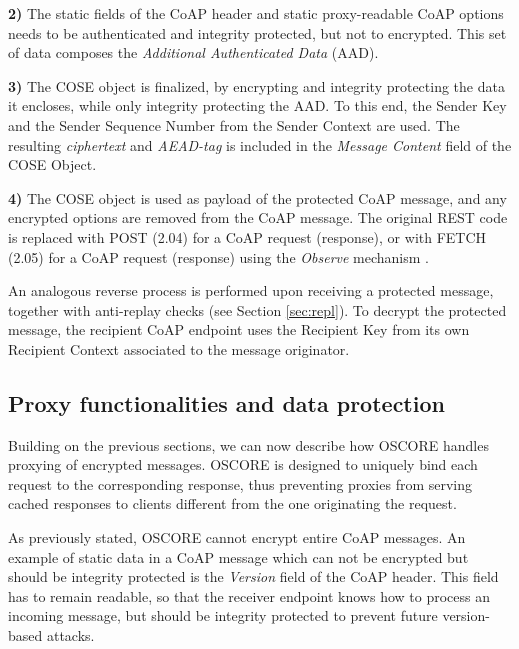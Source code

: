 {\noindent
\textbf{2)} The static fields of the CoAP header and static proxy-readable CoAP options needs to be authenticated and integrity protected, but not to encrypted. This set of data composes the \emph{Additional Authenticated Data} (AAD).

\noindent
\textbf{3)} The COSE object is finalized, by encrypting and integrity protecting the data it encloses, while only integrity protecting the AAD. To this end, the Sender Key and the Sender Sequence Number from the Sender Context are used. The resulting \emph{ciphertext} and \emph{AEAD-tag} is included in the \emph{Message Content} field of the COSE Object.

\noindent
\textbf{4)} The COSE object is used as payload of the protected CoAP message, and any encrypted options are removed from the CoAP message. The original REST code is replaced with POST (2.04) for a CoAP request (response), or with FETCH (2.05) for a CoAP request (response) using the \emph{Observe} mechanism \cite{rfc7641}.

An analogous reverse process is performed upon receiving a protected message, together with anti-replay checks (see Section \ref{sec:repl}). To decrypt the protected message, the recipient CoAP endpoint uses the Recipient Key from its own Recipient Context associated to the message originator.




\subsection{Proxy functionalities and data protection}
\label{ss:proxy_func}
Building on the previous sections, we can now describe how OSCORE handles proxying of encrypted messages. OSCORE is designed to uniquely bind each request to the corresponding response, thus preventing proxies from serving cached responses to clients different from the one originating the request.


As previously stated, OSCORE cannot encrypt entire CoAP messages. An example of static data in a CoAP message which can not be encrypted but should be integrity protected is the \emph{Version} field of the CoAP header. This field has to remain readable, so that the receiver endpoint knows how to process an incoming message, but should be integrity protected to prevent future version-based attacks.

}
